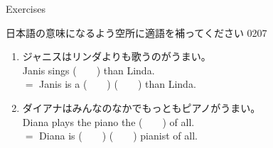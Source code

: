 \documentclass[aspectratio=169,xcolor={dvipsnames,table}]{beamer}
\begin{document}
\begin{frame}[plain]{Exercises}

{\small 日本語の意味になるよう空所に適語を補ってください}%
\hfill{\tiny 0207}\,{\scriptsize {}}
\begin{enumerate}
 \item ジャニスはリンダよりも歌うのがうまい。\\
       Janis sings (~~~~) than Linda.\\
       $=$\,\,Janis is a  (~~~~)  (~~~~) than Linda.
 \item ダイアナはみんなのなかでもっともピアノがうまい。\\
       Diana plays the piano the (~~~~) of all.\\
       $=$\,\,Diana is (~~~~)  (~~~~) pianist of all.
\end{enumerate}
\end{frame}
\end{document}
